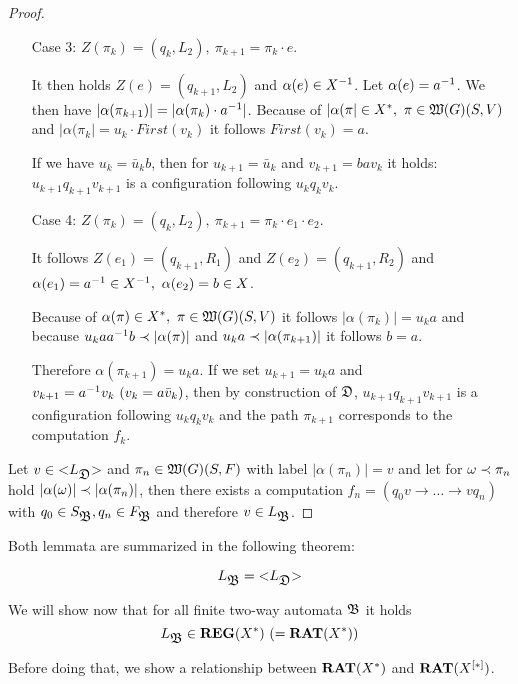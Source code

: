 \begin{proof}
\begin{itemize}
  \item[Case 3:] $Z(\pi_k) = (q_k, L_2),\ \pi_{k+1} = \pi_k \cdot e$.
  
  It then holds $Z(e) = (q_{k+1}, L_2)$ and $\alpha(e) \in {{X}^{-1}}$. Let
  $\alpha(e) = {{a}^{-1}}$. We then have $|\alpha(\pi_{k+1})| = |\alpha(\pi_k)
  \cdot {{a}^{-1}}|$. Because of $|\alpha(\pi| \in X^*,\ \pi \in \mbox{$\mathfrak{W}({G})$}(S, V)$
  and $|\alpha(\pi_k| = u_k \cdot First(v_k)$ it follows $First(v_k) = a$.
  
  If we have $u_k = \bar{u}_k b$, then for $u_{k+1} = \bar{u}_k$ and $v_{k+1} =
  b a v_k$ it holds: $u_{k+1} q_{k+1} v_{k+1}$ is a configuration following
  $u_k q_k v_k$.
  
  \item[Case 4:] $Z(\pi_k) = (q_k, L_2),\ \pi_{k+1} = \pi_k \cdot e_1 \cdot
  e_2$.
  
  It follows $Z(e_1) = (q_{k+1}, R_1)$ and $Z(e_2) = (q_{k+1}, R_2)$ and
  $\alpha(e_1) = \inv{a} \in \inv{X},\ \alpha(e_2) = b \in X$.
  
  Because of $\alpha(\pi) \in X^*,\ \pi \in \mbox{$\mathfrak{W}({G})$}(S, V)$ it follows
  $|\alpha(\pi_k)| = u_k a$ and because $u_k a {{a}^{-1}} b \prec |\alpha(\pi)|$
  and $u_k a \prec |\alpha(\pi_{k+1})|$ it follows $b = a$.
  
  Therefore $\alpha(\pi_{k+1}) = u_k a$. If we set $u_{k+1} = u_k a$ and
  $v_{k+1} = {{a}^{-1}} v_k\ (v_k = a \bar{v}_k)$, then by construction of
  $\mbox{$\mathfrak{D}$}$, $u_{k+1} q_{k+1} v_{k+1}$ is a configuration following $u_k q_k v_k$
  and the path $\pi_{k+1}$ corresponds to the computation $f_k$.
\end{itemize}

Let $v \in \mbox{${<}{L_{\mbox{$\mathfrak{D}$}}}{>}$}$ and $\pi_n \in \mbox{$\mathfrak{W}({G})$}(S, F)$ with label
$|\alpha(\pi_n)| = v$ and let for $\omega \prec \pi_n$ hold $|\alpha(\omega)|
\prec |\alpha(\pi_n)|$, then there exists a computation $f_n = (q_0 v \to
\ldots \to v q_n)$ with $q_0 \in S_{\mbox{$\mathfrak{B}$}},q_n \in F_{\mbox{$\mathfrak{B}$}}$ and therefore
$v \in L_{\mbox{$\mathfrak{B}$}}$.
\end{proof}

Both lemmata are summarized in the following theorem:

\begin{theorem}
\[ L_{\mbox{$\mathfrak{B}$}} = \mbox{${<}{L_{\mbox{$\mathfrak{D}$}}}{>}$} \]
\end{theorem}

\bigskip
We will show now that for all finite two-way automata $\mbox{$\mathfrak{B}$}$ it holds
\[ L_{\mbox{$\mathfrak{B}$}} \in \mbox{{\bf REG}}(X^*)\ (= \mbox{{\bf RAT}}(X^*)) \]

Before doing that, we show a relationship between $\mbox{{\bf RAT}}(X^*)$ and
$\mbox{{\bf RAT}}(\mbox{${X}^{[*]}$})$.

